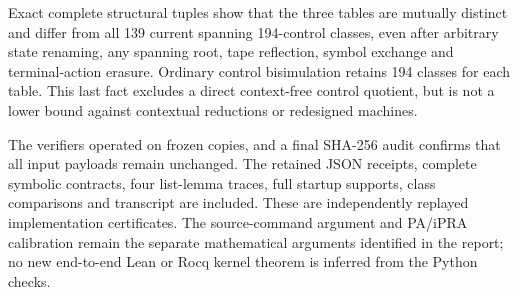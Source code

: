 Exact complete structural tuples show that the three tables are mutually
distinct and differ from all 139 current spanning 194-control classes,
even after arbitrary state renaming, any spanning root, tape reflection,
symbol exchange and terminal-action erasure. Ordinary control bisimulation
retains 194 classes for each table. This last fact excludes a direct
context-free control quotient, but is not a lower bound against contextual
reductions or redesigned machines.

The verifiers operated on frozen copies, and a final SHA-256 audit confirms
that all input payloads remain unchanged. The retained JSON receipts,
complete symbolic contracts, four list-lemma traces, full startup supports,
class comparisons and transcript are included. These are independently
replayed implementation certificates. The source-command argument and
PA/iPRA calibration remain the separate mathematical arguments identified
in the report; no new end-to-end Lean or Rocq kernel theorem is inferred
from the Python checks.
